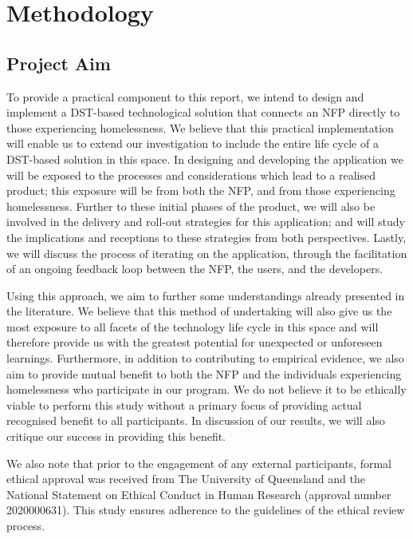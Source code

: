 \chapter{Methodology}

\section{Project Aim}

To provide a practical component to this report, we intend to design and implement a DST-based technological solution that connects an NFP directly to those experiencing homelessness. We believe that this practical implementation will enable us to extend our investigation to include the entire life cycle of a DST-based solution in this space. In designing and developing the application we will be exposed to the processes and considerations which lead to a realised product; this exposure will be from both the NFP, and from those experiencing homelessness. Further to these initial phases of the product, we will also be involved in the delivery and roll-out strategies for this application; and will study the implications and receptions to these strategies from both perspectives. Lastly, we will discuss the process of iterating on the application, through the facilitation of an ongoing feedback loop between the NFP, the users, and the developers.

Using this approach, we aim to further some understandings already presented in the literature. We believe that this method of undertaking will also give us the most exposure to all facets of the technology life cycle in this space and will therefore provide us with the greatest potential for unexpected or unforeseen learnings. Furthermore, in addition to contributing to empirical evidence, we also aim to provide mutual benefit to both the NFP and the individuals experiencing homelessness who participate in our program. We do not believe it to be ethically viable to perform this study without a primary focus of providing actual recognised benefit to all participants. In discussion of our results, we will also critique our success in providing this benefit.

We also note that prior to the engagement of any external participants, formal ethical approval was received from The University of Queensland and the National Statement on Ethical Conduct in Human Research (approval number 2020000631). This study ensures adherence to the guidelines of the ethical review process.

